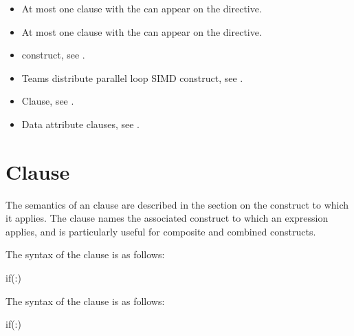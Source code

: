 {{{{\begin{itemize}
\item At most one  clause with the 
       can appear on the directive.

\item At most one  clause with the 
       can appear on the directive.
\end{itemize}

\crossreferences
\begin{itemize}
\item {} construct, see .

\item Teams distribute parallel loop SIMD construct, see 
      .

\item {} Clause, see .

\item Data attribute clauses, see 
      .
\end{itemize}




\section{ Clause}
\label{sec:if Clause}

\summary
The semantics of an  clause are described in the section on the
construct to which it applies. 
The  clause  names the associated
construct to which an expression applies, and is particularly useful for 
composite and combined constructs.

\syntax
\ccppspecificstart

The syntax of the  clause is as follows:

\begin{boxedcode}
if(\plc{[ directive-name-modifier }:\plc{] scalar-expression}) 
\end{boxedcode}
\ccppspecificend

\fortranspecificstart

The syntax of the  clause is as follows:

\begin{boxedcode}
if(\plc{[ directive-name-modifier }:\plc{] scalar-logical-expression}) 
\end{boxedcode}
\fortranspecificend

}}}}
